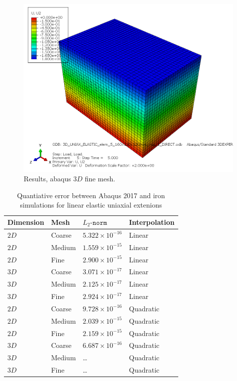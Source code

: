 \begin{figure}[h!]
    \centering 
    \includegraphics[width=\columnwidth]{examples/example-0101/doc/figures/3D_UNIAX_ELASTIC_elem_5_160x120x120mm_intp_1_DIRECTU2.png} 
    \caption{Results, abaqus $3D$ fine mesh.}
    \label{example-0101-abaqus-3D-fig}
\end{figure}
%
\begin{table}[h!]
	\centering
    \begin{tabular}{llll}
    Dimension & Mesh 		& $L_2\texttt{-norm}$			& Interpolation \\ \hline
    $2D$      & Coarse 	& $5.322\times 10^{-16}$	& Linear \\
    $2D$      & Medium  & $1.559\times 10^{-15}$	& Linear \\
    $2D$      & Fine  	& $2.900\times 10^{-15}$	& Linear \\
    $3D$      & Coarse  & $3.071\times 10^{-17}$	& Linear \\
    $3D$      & Medium  & $2.125\times 10^{-17}$	& Linear \\
		$3D$			&	Fine 		&	$2.924\times 10^{-17}$	& Linear \\
    $2D$      & Coarse 	& $9.728\times 10^{-16}$	& Quadratic \\
    $2D$      & Medium  & $2.039\times 10^{-15}$	& Quadratic \\
    $2D$      & Fine  	& $2.159\times 10^{-15}$	& Quadratic \\
    $3D$      & Coarse  & $6.687\times 10^{-16}$	& Quadratic \\
    $3D$      & Medium  & \ldots									& Quadratic \\
		$3D$			&	Fine 		&	\ldots									& Quadratic \\		
    \end{tabular}
		\caption{Quantiative error between Abaqus 2017 and iron simulations for linear elastic uniaxial extenions}
		\label{tab:example-0101-valid-Iron-Abaqus}
\end{table}

